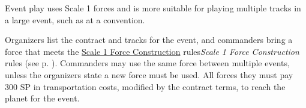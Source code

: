Event play uses Scale 1 forces and is more suitable for playing multiple tracks in a large event, such as at a convention.

Organizers list the contract and tracks for the event, and commanders bring a force that meets the  {\hyperref[subsec:force_construction_scale_1]{Scale 1 Force Construction} rules}{\emph{Scale 1 Force Construction} rules (see p. \pageref{subsec:force_construction_scale_1})}.
Commanders may use the same force between multiple events, unless the organizers state a new force must be used.
All forces they must pay 300 SP in transportation costs, modified by the contract terms, to reach the planet for the event.
